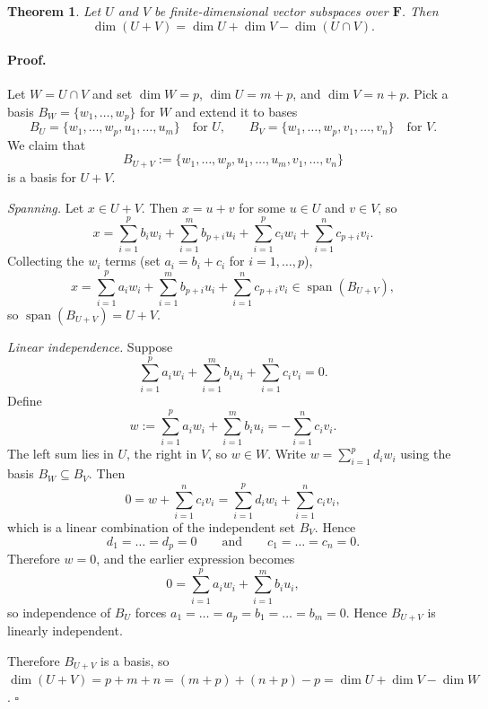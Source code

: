 \documentclass[11pt]{article}
\newtheorem{theorem}{Theorem}
\begin{document}
\begin{theorem}
Let $U$ and $V$ be finite-dimensional vector subspaces over $\mathbf{F}$. Then
\[
  \dim(U+V) = \dim U + \dim V - \dim(U \cap V).
\]
\end{theorem}

\paragraph{Proof.}
Let $W = U \cap V$ and set $\dim W = p$, $\dim U = m + p$, and $\dim V = n + p$.
Pick a basis $B_{W} = \{w_{1},\dots,w_{p}\}$ for $W$ and extend it to bases
\[
  B_{U} = \{w_{1},\dots,w_{p},u_{1},\dots,u_{m}\} \quad\text{for $U$,}\qquad
  B_{V} = \{w_{1},\dots,w_{p},v_{1},\dots,v_{n}\} \quad\text{for $V$}.
\]
We claim that
\[
  B_{U+V} := \{w_{1},\dots,w_{p},u_{1},\dots,u_{m},v_{1},\dots,v_{n}\}
\]
is a basis for $U+V$.

\medskip
\noindent\textit{Spanning.}
Let $x \in U+V$. Then $x = u + v$ for some $u \in U$ and $v \in V$, so
\[
  x = \sum_{i=1}^{p} b_{i} w_{i} + \sum_{i=1}^{m} b_{p+i} u_{i}
    + \sum_{i=1}^{p} c_{i} w_{i} + \sum_{i=1}^{n} c_{p+i} v_{i}.
\]
Collecting the $w_{i}$ terms (set $a_{i} = b_{i} + c_{i}$ for $i = 1,\dots,p$),
\[
  x = \sum_{i=1}^{p} a_{i} w_{i} + \sum_{i=1}^{m} b_{p+i} u_{i}
      + \sum_{i=1}^{n} c_{p+i} v_{i} \in \operatorname{span}(B_{U+V}),
\]
so $\operatorname{span}(B_{U+V}) = U+V$.

\medskip
\noindent\textit{Linear independence.}
Suppose
\[
  \sum_{i=1}^{p} a_{i} w_{i} + \sum_{i=1}^{m} b_{i} u_{i} + \sum_{i=1}^{n} c_{i} v_{i} = 0.
\]
Define
\[
  w := \sum_{i=1}^{p} a_{i} w_{i} + \sum_{i=1}^{m} b_{i} u_{i} = -\sum_{i=1}^{n} c_{i} v_{i}.
\]
The left sum lies in $U$, the right in $V$, so $w \in W$.
Write $w = \sum_{i=1}^{p} d_{i} w_{i}$ using the basis $B_{W} \subseteq B_{V}$.
Then
\[
  0 = w + \sum_{i=1}^{n} c_{i} v_{i}
    = \sum_{i=1}^{p} d_{i} w_{i} + \sum_{i=1}^{n} c_{i} v_{i},
\]
which is a linear combination of the independent set $B_{V}$. Hence
\[
  d_{1} = \dots = d_{p} = 0
  \qquad\text{and}\qquad
  c_{1} = \dots = c_{n} = 0.
\]
Therefore $w = 0$, and the earlier expression becomes
\[
  0 = \sum_{i=1}^{p} a_{i} w_{i} + \sum_{i=1}^{m} b_{i} u_{i},
\]
so independence of $B_{U}$ forces $a_{1} = \dots = a_{p} = b_{1} = \dots = b_{m} = 0$.
Hence $B_{U+V}$ is linearly independent.

Therefore $B_{U+V}$ is a basis, so $\dim(U+V) = p + m + n = (m+p) + (n+p) - p = \dim U + \dim V - \dim W$. \hfill $\square$
\end{document}
